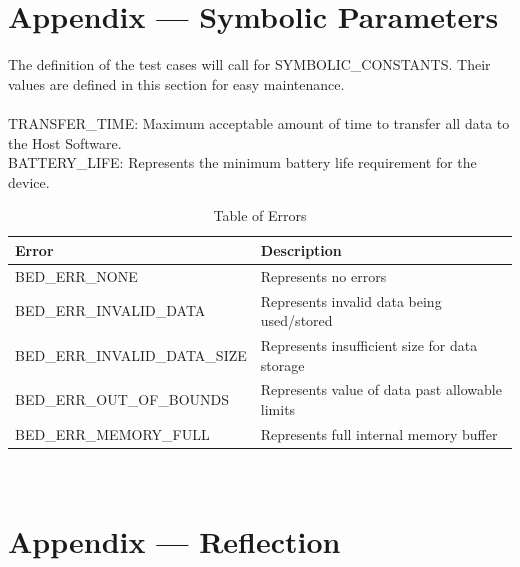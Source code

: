 \documentclass[12pt, titlepage]{article}
\begin{document}
\pagebreak




\newpage


\section*{Appendix --- Symbolic Parameters}
The definition of the test cases will call for SYMBOLIC\_CONSTANTS.
Their values are defined in this section for easy maintenance.\\\\

TRANSFER\_TIME: Maximum acceptable amount of time to transfer all data to the Host Software.\\
BATTERY\_LIFE: Represents the minimum battery life requirement for the device.\\


\begin{flushleft} 
	\begin{table}[H]
		\begin{tabular}{l l} 
			  \toprule		
				  \textbf{Error} & \textbf{Description}\\
				  \midrule 
				  BED\_ERR\_NONE 					& Represents no errors\\
				  BED\_ERR\_INVALID\_DATA			& Represents invalid data being used/stored\\
				  BED\_ERR\_INVALID\_DATA\_SIZE 		& Represents insufficient size for data storage\\
				  BED\_ERR\_OUT\_OF\_BOUNDS 		& Represents value of data past allowable limits\\
				  BED\_ERR\_MEMORY\_FULL 			& Represents full internal memory buffer\\
		
			  \bottomrule
		\end{tabular}\\
		\caption{\label{Err}Table of Errors}

	\end{table}
\end{flushleft} 


\newpage{}
\section*{Appendix --- Reflection}
\end{document}
